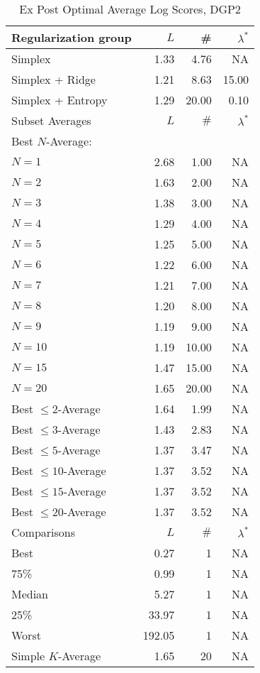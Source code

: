 \begin{table}[htp] 
\begin{center} 
\caption{Ex Post Optimal Average Log Scores, DGP2} 
\begin{tabular}{lrrr} 
\toprule 
\toprule 
Regularization group & $ L $ & \# & $\lambda^*$ \\ 
\midrule 
Simplex & 1.33 & 4.76 & NA \\ 
Simplex + Ridge & 1.21 & 8.63 & 15.00 \\ 
Simplex + Entropy & 1.29 & 20.00 & 0.10 \\ 
\midrule 
\midrule 
Subset Averages & $ L $ & $\#$ & $\lambda^*$ \\ 
\midrule 
Best $N$-Average: &  &  & \\ 
\quad $N = 1$ & 2.68 & 1.00 & NA \\ 
\quad $N = 2$ & 1.63 & 2.00 & NA \\ 
\quad $N = 3$ & 1.38 & 3.00 & NA \\ 
\quad $N = 4$ & 1.29 & 4.00 & NA \\ 
\quad $N = 5$ & 1.25 & 5.00 & NA \\ 
\quad $N = 6$ & 1.22 & 6.00 & NA \\ 
\quad $N = 7$ & 1.21 & 7.00 & NA \\ 
\quad $N = 8$ & 1.20 & 8.00 & NA \\ 
\quad $N = 9$ & 1.19 & 9.00 & NA \\ 
\quad $N = 10$ & 1.19 & 10.00 & NA \\ 
\quad $N = 15$ & 1.47 & 15.00 & NA \\ 
\quad $N = 20$ & 1.65 & 20.00 & NA \\ 
Best $\leq 2$-Average & 1.64 & 1.99 & NA \\ 
Best $\leq 3$-Average & 1.43 & 2.83 & NA \\ 
Best $\leq 5$-Average & 1.37 & 3.47 & NA \\ 
Best $\leq 10$-Average & 1.37 & 3.52 & NA \\ 
Best $\leq 15$-Average & 1.37 & 3.52 & NA \\ 
Best $\leq 20$-Average & 1.37 & 3.52 & NA \\ 
\midrule 
\midrule 
Comparisons & $ L $ & $\#$ & $\lambda^*$ \\ 
\midrule 
Best & 0.27 & 1 & NA \\ 
75\% & 0.99 & 1 & NA \\ 
Median & 5.27 & 1 & NA \\ 
25\% & 33.97 & 1 & NA \\ 
Worst & 192.05 & 1 & NA \\ 
\midrule 
Simple $K$-Average & 1.65 & 20 & NA \\ 
\bottomrule 
\bottomrule 
\end{tabular} 
\end{center} 
\end{table} 
